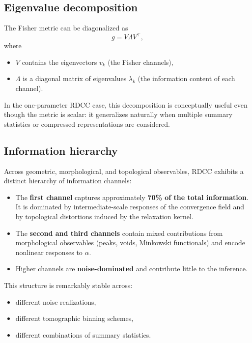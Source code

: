 \documentclass[11pt,a4paper]{article}
\begin{document}
\subsection{Eigenvalue decomposition}

The Fisher metric can be diagonalized as
\begin{equation}
g
=
V \Lambda V^\top,
\end{equation}
where
\begin{itemize}
    \item $V$ contains the eigenvectors $v_k$ (the Fisher channels),
    \item $\Lambda$ is a diagonal matrix of eigenvalues $\lambda_k$ 
    (the information content of each channel).
\end{itemize}

In the one-parameter RDCC case, this decomposition is conceptually useful even 
though the metric is scalar: it generalizes naturally when multiple summary 
statistics or compressed representations are considered.

\subsection{Information hierarchy}

Across geometric, morphological, and topological observables, RDCC exhibits a 
distinct hierarchy of information channels:
\begin{itemize}
    \item The \textbf{first channel} captures approximately \textbf{70\% of the 
    total information}. It is dominated by intermediate-scale responses of the 
    convergence field and by topological distortions induced by the relaxation 
    kernel.

    \item The \textbf{second and third channels} contain mixed contributions 
    from morphological observables (peaks, voids, Minkowski functionals) and 
    encode nonlinear responses to $\alpha$.

    \item Higher channels are \textbf{noise-dominated} and contribute little to 
    the inference.
\end{itemize}

This structure is remarkably stable across:
\begin{itemize}
    \item different noise realizations,
    \item different tomographic binning schemes,
    \item different combinations of summary statistics.
\end{itemize}
\end{document}
